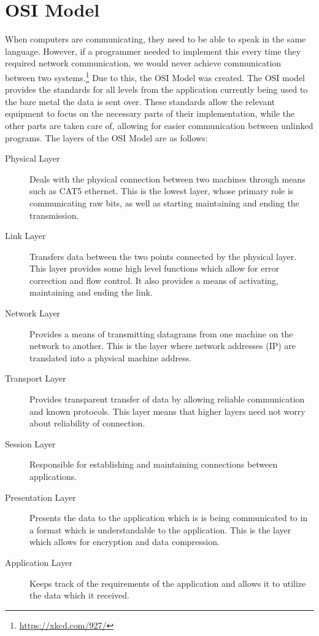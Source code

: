 \documentclass[a4paper,11pt]{report}
\begin{document}
	\section{OSI Model}
		When computers are communicating, they need to be able to speak in the same language.\cite{HackingAOE} 
		However, if a programmer needed to implement this every time they required network communication, we would never achieve communication between two systems.\footnote{\url{https://xkcd.com/927/}} 
		Due to this, the OSI Model was created. 
		The OSI model provides the standards for all levels from the application currently being used to the bare metal the data is sent over. 
		These standards allow the relevant equipment to focus on the necessary parts of their implementation, while the other parts are taken care of, allowing for easier communication between unlinked programs. 
		The layers of the OSI Model are as follows:
		\begin{description}
			\item[Physical Layer]
				Deals with the physical connection between two machines through means such as CAT5 ethernet. 
				This is the lowest layer, whose primary role is communicating raw bits, as well as starting maintaining and ending the transmission. 
			\item[Link Layer]
				Transfers data between the two points connected by the physical layer. 
				This layer provides some high level functions which allow for error correction and flow control. 
				It also provides a means of activating, maintaining and ending the link. 
			\item[Network Layer]
				Provides a means of transmitting datagrams from one machine on the network to another. 
				This is the layer where network addresses (IP) are translated into a physical machine address. 
			\item[Transport Layer]
				Provides transparent transfer of data by allowing reliable communication and known protocols. 
				This layer means that higher layers need not worry about reliability of connection. 
			\item[Session Layer]
				Responsible for establishing and maintaining connections between applications. 
			\item[Presentation Layer]
				Presents the data to the application which is is being communicated to in a format which is understandable to the application. 
				This is the layer which allows for encryption and data compression. 
			\item[Application Layer] 
				Keeps track of the requirements of the application and allows it to utilize the data which it received. 
		\end{description}
\end{document}
